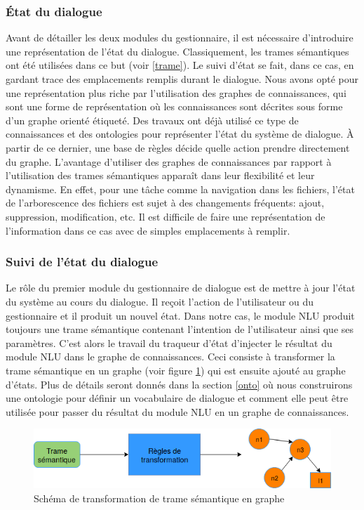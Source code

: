\subsubsection{État du dialogue}
Avant de détailler les deux modules du gestionnaire, il est nécessaire d'introduire une représentation de l'état du dialogue. Classiquement, les trames sémantiques ont été utilisées dans ce but (voir \ref{trame}). Le suivi d'état se fait, dans ce cas, en gardant trace des emplacements remplis durant le dialogue.
Nous avons opté pour une représentation plus riche par l'utilisation des graphes de connaissances, qui sont une forme de représentation où les connaissances sont décrites sous forme d'un graphe orienté étiqueté. Des travaux ont déjà utilisé ce type de connaissances \citep{Stoyanchev2018} et des ontologies \citep{Wessel2019} pour représenter l'état du système de dialogue. À partir de ce dernier, une base de règles décide quelle action prendre directement du graphe. L'avantage d'utiliser des graphes de connaissances par rapport à l'utilisation des trames sémantiques apparaît dans leur flexibilité et leur dynamisme. En effet, pour une tâche comme la navigation dans les fichiers, l'état de l'arborescence des fichiers est sujet à des changements fréquents: ajout, suppression, modification, etc. Il est difficile de faire une représentation de l'information dans ce cas avec de simples emplacements à remplir.
\subsubsection{Suivi de l'état du dialogue}
Le rôle du premier module du gestionnaire de dialogue est de mettre à jour l'état du système au cours du dialogue. Il reçoit l'action de l'utilisateur ou du gestionnaire et il produit un nouvel état. Dans notre cas, le module NLU produit toujours une trame sémantique contenant l'intention de l'utilisateur ainsi que ses paramètres. C'est alors le travail du traqueur d'état d'injecter le résultat du module NLU dans le graphe de connaissances. Ceci consiste à transformer la trame sémantique en un graphe (voir figure \ref{transformer}) qui est ensuite ajouté au graphe d'états. Plus de détails seront donnés dans la section \ref{onto} où nous construirons une ontologie pour définir un vocabulaire de dialogue et comment elle peut être utilisée pour passer du résultat du module NLU en un graphe de connaissances.
\begin{figure}[H] 
	
	\centering
	\includegraphics[width=0.8\linewidth]{images/Conception/DM/Transformer.png}
	\caption{Schéma de transformation de trame sémantique en graphe}\label{transformer}
\end{figure}
